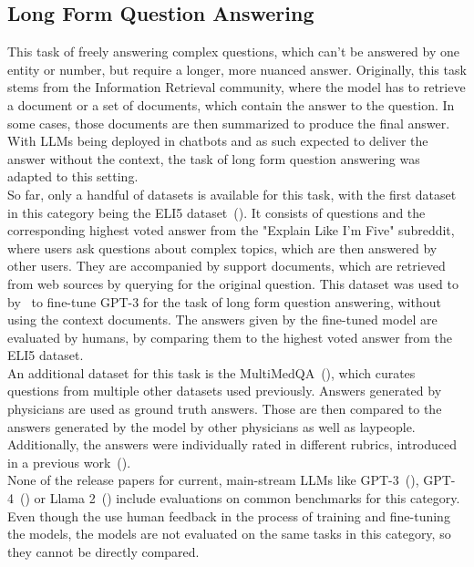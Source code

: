 \subsection{Long Form Question Answering}\label{free-form-qa}
This task of freely answering complex questions, which can't be answered by one entity or number, but require a longer, more nuanced answer.
Originally, this task stems from the Information Retrieval community, where the model has to retrieve a document or a set of documents, which contain the answer to the question.
In some cases, those documents are then summarized to produce the final answer.
With LLMs being deployed in chatbots and as such expected to deliver the answer without the context, the task of long form question answering was adapted to this setting.
\\
So far, only a handful of datasets is available for this task, with the first dataset in this category being the ELI5 dataset~(\cite{fan:2019}).
It consists of questions and the corresponding highest voted answer from the "Explain Like I'm Five" subreddit, where users ask questions about complex topics, which are then answered by other users.
They are accompanied by support documents, which are retrieved from web sources by querying for the original question.
This dataset was used to by~\cite{nakano:2021} to fine-tune GPT-3 for the task of long form question answering, without using the context documents.
The answers given by the fine-tuned model are evaluated by humans, by comparing them to the highest voted answer from the ELI5 dataset.
\\ 
An additional dataset for this task is the MultiMedQA~(\cite{singhal:2023}), which curates questions from multiple other datasets used previously. 
Answers generated by physicians are used as ground truth answers.
Those are then compared to the answers generated by the model by other physicians as well as laypeople.
Additionally, the answers were individually rated in different rubrics, introduced in a previous work~(\cite{singhal:2022}).
\\
None of the release papers for current, main-stream LLMs like GPT-3~(\cite{brown:2020}), GPT-4~(\cite{openai:2023}) or Llama 2~(\cite{touvron:2023}) include evaluations on common benchmarks for this category.
Even though the use human feedback in the process of training and fine-tuning the models, the models are not evaluated on the same tasks in this category, so they cannot be directly compared.

